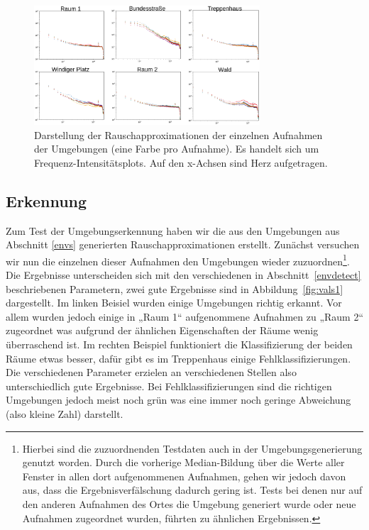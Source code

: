 \documentclass[
	fontsize=10.5pt,
	marginpar=false,
	ngerman,
	accentcolor=3d
	]{tudapub}
\begin{document}
\begin{figure}[h]
	\centering
	\includegraphics[width=0.75\textwidth]{media/envs2}
	\caption{Darstellung der Rauschapproximationen der einzelnen Aufnahmen der Umgebungen (eine Farbe pro Aufnahme). Es handelt sich um Frequenz-Intensitätsplots. Auf den x-Achsen sind Herz aufgetragen.}
	\label{fig:envs2}
\end{figure}



\pagebreak
\subsection{Erkennung}

Zum Test der Umgebungserkennung haben wir die aus den Umgebungen aus Abschnitt \ref{envs} generierten Rauschapproximationen erstellt. Zunächst versuchen wir nun die einzelnen dieser Aufnahmen den Umgebungen wieder zuzuordnen\footnote{Hierbei sind die zuzuordnenden Testdaten auch in der Umgebungsgenerierung genutzt worden. Durch die vorherige Median-Bildung über die Werte aller Fenster in allen dort aufgenommenen Aufnahmen, gehen wir jedoch davon aus, dass die Ergebnisverfälschung dadurch gering ist. Tests bei denen nur auf den anderen Aufnahmen des Ortes die Umgebung generiert wurde oder neue Aufnahmen zugeordnet wurden, führten zu ähnlichen Ergebnissen.}. Die Ergebnisse unterscheiden sich mit den verschiedenen in Abschnitt~\ref{envdetect} beschriebenen Parametern, zwei gute Ergebnisse sind in Abbildung~\ref{fig:vals1} dargestellt. Im linken Beisiel wurden einige Umgebungen richtig erkannt. Vor allem wurden jedoch einige in „Raum 1“ aufgenommene Aufnahmen zu „Raum 2“ zugeordnet was aufgrund der ähnlichen Eigenschaften der Räume wenig überraschend ist. Im rechten Beispiel funktioniert die Klassifizierung der beiden Räume etwas besser, dafür gibt es im Treppenhaus einige Fehlklassifizierungen. Die verschiedenen Parameter erzielen an verschiedenen Stellen also unterschiedlich gute Ergebnisse. Bei Fehlklassifizierungen sind die richtigen Umgebungen jedoch meist noch grün was eine immer noch geringe Abweichung (also kleine Zahl) darstellt.
\end{document}
